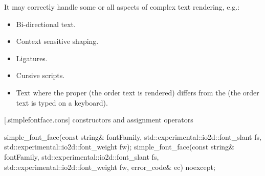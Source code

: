 \pnum
It may correctly handle some or all aspects of complex text rendering, e.g.:
\begin{itemize}
	\item Bi-directional text.
	\item Context sensitive shaping.
	\item Ligatures.
	\item Cursive scripts.
	\item Text where the proper  (the order text is rendered) differs from the  (the order text is typed on a keyboard).
\end{itemize}

 [\iotwod.simplefontface.cons] { constructors and 
assignment operators}

\begin{itemdecl}
    simple_font_face(const string& fontFamily,
      std::experimental::io2d::font_slant fs,
      std::experimental::io2d::font_weight fw);
    simple_font_face(const string& fontFamily,
      std::experimental::io2d::font_slant fs,
      std::experimental::io2d::font_weight fw, error_code& ec) noexcept;
\end{itemdecl}
